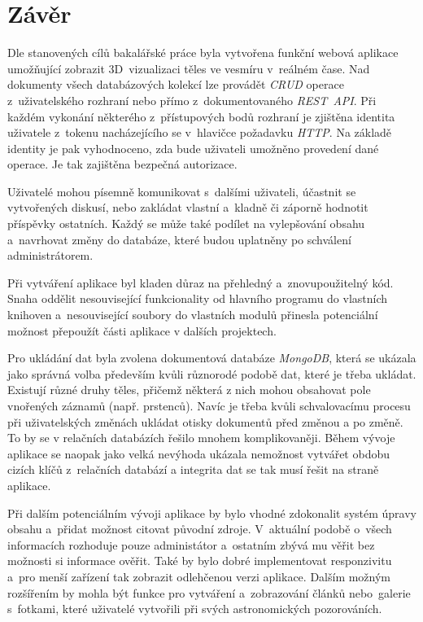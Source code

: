\documentclass[a4paper,12pt]{article}
\begin{document}
\clearpage {} {}
\section*{Závěr}

Dle stanovených cílů bakalářské práce byla vytvořena funkční webová aplikace umožňující zobrazit 3D~vizualizaci těles ve vesmíru v~reálném čase. Nad dokumenty všech databázových kolekcí lze provádět \textit{CRUD} operace z~uživatelského rozhraní nebo přímo z~dokumentovaného \textit{REST~API}. Při každém vykonání některého z~přístupových bodů rozhraní je zjištěna identita uživatele z~tokenu nacházejícího se v~hlavičce požadavku \textit{HTTP}. Na základě identity je pak vyhodnoceno, zda bude uživateli umožněno provedení dané operace. Je tak zajištěna bezpečná autorizace.

Uživatelé mohou písemně komunikovat s~dalšími uživateli, účastnit se vytvořených diskusí, nebo zakládat vlastní a~kladně či záporně hodnotit příspěvky ostatních. Každý se může také podílet na vylepšování obsahu a~navrhovat změny do databáze, které budou uplatněny po schválení administrátorem.

Při vytváření aplikace byl kladen důraz na přehledný a~znovupoužitelný kód. Snaha oddělit nesouvisející funkcionality od hlavního programu do vlastních knihoven a~nesouvisející soubory do vlastních modulů přinesla potenciální možnost přepoužít části aplikace v dalších projektech.

Pro ukládání dat byla zvolena dokumentová databáze \textit{MongoDB}, která se ukázala jako správná volba především kvůli různorodé podobě dat, které je třeba ukládat. Existují různé druhy těles, přičemž některá z nich mohou obsahovat pole vnořených záznamů (např. prstenců). Navíc je třeba kvůli schvalovacímu procesu při uživatelských změnách ukládat otisky dokumentů před změnou a po změně. To by se v relačních databázích řešilo mnohem komplikovaněji. Během vývoje aplikace se naopak jako velká nevýhoda ukázala nemožnost vytvářet obdobu cizích klíčů z~relačních databází a integrita dat se tak musí řešit na straně aplikace.

Při dalším potenciálním vývoji aplikace by bylo vhodné zdokonalit systém úpravy obsahu a~přidat možnost citovat původní zdroje. V~aktuální podobě o~všech informacích rozhoduje pouze administátor a~ostatním zbývá mu věřit bez možnosti si informace ověřit. Také by bylo dobré implementovat responzivitu a~pro menší zařízení tak zobrazit odlehčenou verzi aplikace. Dalším možným rozšířením by mohla být funkce pro vytváření a~zobrazování článků nebo~galerie s~fotkami, které uživatelé vytvořili při svých astronomických pozorováních.
\end{document}
